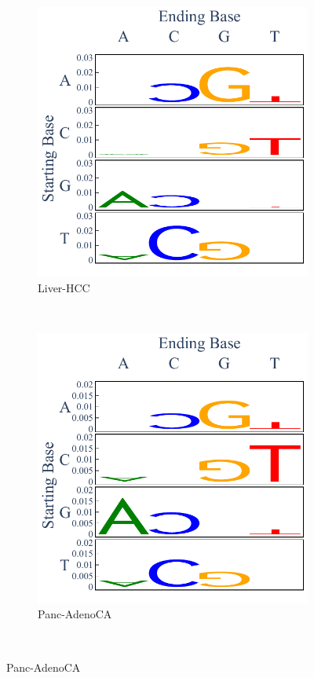 \begin{figure}[ht!]
    \begin{subfigure}{.5\textwidth}
    \includegraphics[scale=0.7]{graphics/spectra_Liver-HCC.pdf}
    \caption{Liver-HCC}
    \label{fig:spectra_liver}
    \end{subfigure}
    ~
    \begin{subfigure}{.5\textwidth}
    \includegraphics[scale=0.7]{graphics/spectra_Panc-AdenoCA.pdf}
    \caption{Panc-AdenoCA}
    \label{fig:spectra_panc_adenoca}
    \end{subfigure} \\
    

\end{figure}
